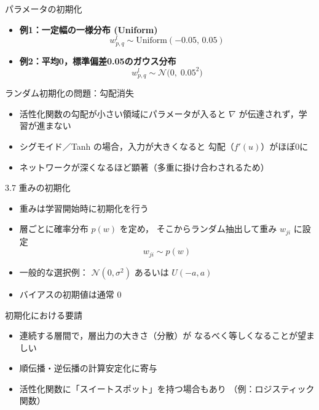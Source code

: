 \documentclass[dvipdfmx,autodetect-engine]{beamer}
\begin{document}
\begin{frame}{パラメータの初期化}
  \begin{itemize}
    \item \textbf{例1：一定幅の一様分布 (Uniform)}
      \[
        w_{p,q}^l \sim \mathrm{Uniform}(-0.05,\,0.05)
      \]
    \item \textbf{例2：平均0，標準偏差0.05のガウス分布}
      \[
        w_{p,q}^l \sim \mathcal{N}\bigl(0,\;0.05^2\bigr)
      \]
  \end{itemize}
\end{frame}

\begin{frame}{ランダム初期化の問題：勾配消失}
  \begin{itemize}
    \item 活性化関数の勾配が小さい領域にパラメータが入ると  
          \(\nabla\) が伝達されず，学習が進まない
    \item シグモイド／Tanh の場合，入力が大きくなると  
          勾配（\(f'(u)\)）がほぼ0に  
    \item ネットワークが深くなるほど顕著（多重に掛け合わされるため）
  \end{itemize}
\end{frame}


\begin{frame}{3.7 重みの初期化}
  \begin{itemize}
    \item 重みは学習開始時に初期化を行う
    \item 層ごとに確率分布 \(p(w)\) を定め，
      そこからランダム抽出して重み \(w_{ji}\) に設定
      \[
        w_{ji}\sim p(w)
      \]
    \item 一般的な選択例：
      \(\mathcal{N}(0,\sigma^2)\) あるいは
      \(U(-a,a)\)
    \item バイアスの初期値は通常 \(0\)
  \end{itemize}
\end{frame}

\begin{frame}{初期化における要請}
  \begin{itemize}
    \item 連続する層間で，層出力の大きさ（分散）が
      なるべく等しくなることが望ましい
    \item 順伝播・逆伝播の計算安定化に寄与
    \item 活性化関数に「スイートスポット」を持つ場合もあり
      （例：ロジスティック関数）
  \end{itemize}
\end{frame}
\end{document}
